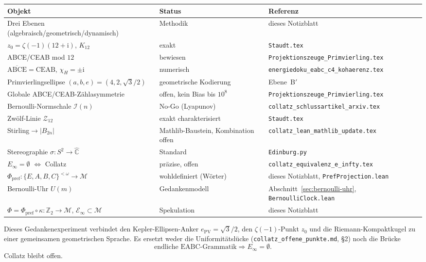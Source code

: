 \documentclass[11pt,a4paper]{article}
\theoremstyle{definition}
\theoremstyle{remark}
\newcommand{\C}{\mathbb{C}}
\newcommand{\Ztwo}{\mathbb{Z}_2}
\newcommand{\Chat}{\widehat{\C}}
\newcommand{\Einf}{E_{\infty}}
\newcommand{\SigmaEABC}{\{E,A,B,C\}}
\newcommand{\Phpref}{\Phi_{\mathrm{pref}}}
\begin{document}
\begin{center}
  \begin{tabular}{@{}lll@{}}
    \toprule
    Objekt & Status & Referenz \\
    \midrule
    Drei Ebenen (algebraisch/geometrisch/dynamisch) & Methodik & dieses Notizblatt \\
    $z_0=\zeta(-1)(12+\mathrm{i})$, $K_{12}$ & exakt & \texttt{Staudt.tex} \\
    ABCE/CEAB mod $12$ & bewiesen & \texttt{Projektionszeuge\_Primvierling.tex} \\
    $\overline{\mathrm{ABCE}}=\mathrm{CEAB}$, $\chi_H=\pm\mathrm{i}$ & numerisch & \texttt{energiedoku\_eabc\_c4\_kohaerenz.tex} \\
    Primvierlingsellipse $(a,b,e)=(4,2,\sqrt{3}/2)$ & geometrische Kodierung & Ebene~B$'$ \\
    Globale ABCE/CEAB-Zählasymmetrie & offen, kein Bias bis $10^8$ & \texttt{Projektionszeuge\_Primvierling.tex} \\
    Bernoulli-Normschale $\mathcal{I}(n)$ & No-Go (Lyapunov) & \texttt{collatz\_schlussartikel\_arxiv.tex} \\
    Zwölf-Linie $\mathcal{Z}_{12}$ & exakt charakterisiert & \texttt{Staudt.tex} \\
    Stirling$\to|B_{2n}|$ & Mathlib-Baustein, Kombination offen & \texttt{collatz\_lean\_mathlib\_update.tex} \\
    Stereographie $\sigma:S^2\to\Chat$ & Standard & \texttt{Edinburg.py} \\
    $\Einf=\emptyset$ $\Leftrightarrow$ Collatz & präzise, offen & \texttt{collatz\_equivalenz\_e\_infty.tex} \\
    $\Phpref:\SigmaEABC^{<\omega}\to\mathcal{M}$ & wohldefiniert (Wörter) & dieses Notizblatt, \texttt{PrefProjection.lean} \\
    Bernoulli-Uhr $U(m)$ & Gedankenmodell & Abschnitt~\ref{sec:bernoulli-uhr}, \texttt{BernoulliClock.lean} \\
    $\Phi=\Phpref\circ\kappa:\Ztwo\to\mathcal{M}$, $\mathcal{E}_\infty\subset\mathcal{M}$ & Spekulation & dieses Notizblatt \\
  \bottomrule
  \end{tabular}
\end{center}

\medskip
\noindent
Dieses Gedankenexperiment verbindet den Kepler-Ellipsen-Anker
$e_{\mathrm{PV}}=\sqrt{3}/2$, den $\zeta(-1)$-Punkt $z_0$ und die
Riemann-Kompaktkugel zu einer gemeinsamen geometrischen Sprache.
Es ersetzt weder die Uniformitätslücke
(\texttt{collatz\_offene\_punkte.md}, §2) noch die Brücke
\[
\text{endliche EABC-Grammatik}\Rightarrow\Einf=\emptyset.
\]
Collatz bleibt offen.
\end{document}
